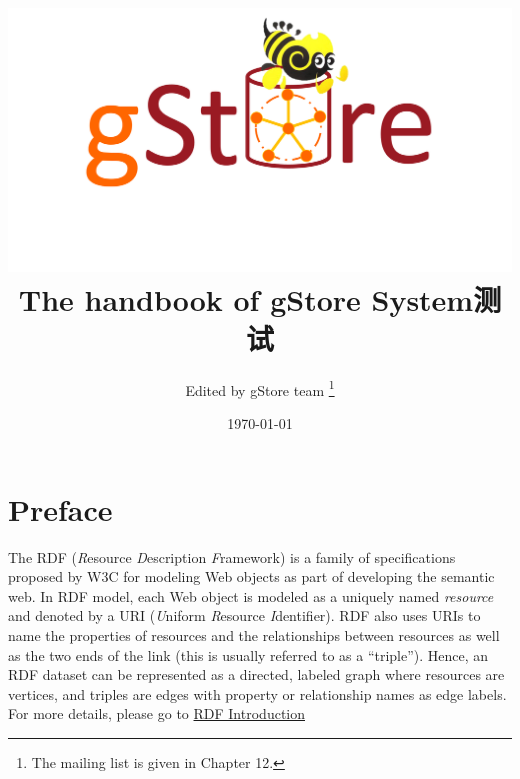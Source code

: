 \documentclass[titlepage, a4paper, 12pt]{article}
\begin{document}
\title{\includegraphics[scale=0.3, bb=0 0 385 567]{../logo.png} \\
	The handbook of gStore System测试}
\author{Edited by gStore team \footnote{The mailing list is given in Chapter 12.}}
\date{\today}
\maketitle



\setcounter{tocdepth}{4}
\tableofcontents
\clearpage

\section{Preface}
The RDF (\emph{R}esource \emph{D}escription \emph{F}ramework) is a family of specifications proposed by W3C for modeling Web objects as part of developing the semantic web. In RDF model, each Web object is modeled as a uniquely named \emph{resource} and denoted by a URI (\emph{U}niform \emph{R}esource \emph{I}dentifier). RDF also uses URIs to name the properties of resources and the relationships between resources as well as the two ends of the link (this is usually referred to as a ``triple''). Hence, an RDF dataset can be represented as a directed, labeled graph where resources are vertices, and triples are
edges with property or relationship names as edge labels. For more details, please go to \href{https://www.w3.org/RDF/}{RDF Introduction}\\
\end{document}
